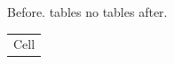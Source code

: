 \documentclass{article}
\begin{document}
Before. \iftotaltables tables \else no tables \fi after.
\begin{tabular}{l}\cellcolor{Maroon}Cell\end{tabular}
\end{document}

